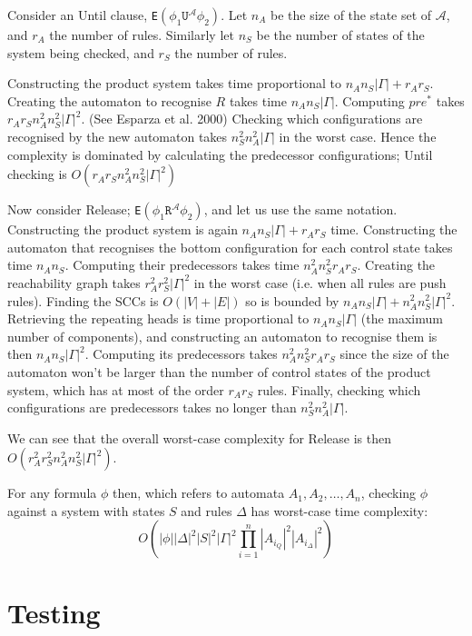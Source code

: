 \documentclass[11pt]{article}
\theoremstyle{definition}
\begin{document}
Consider an Until clause, \texttt{E}$(\phi_1\texttt{U}^{\mathcal{A}}\phi_2)$.
Let $n_A$ be the size of the state set of $\mathcal{A}$, and $r_A$ the number of rules.
Similarly let $n_S$ be the number of states of the system being checked, and
$r_S$ the number of rules.

Constructing the product system takes time proportional to $n_A n_S |\Gamma| + r_A r_S$.
Creating the automaton to recognise $R$ takes time $n_A n_S |\Gamma|$.
Computing $\textit{pre}^*$ takes $r_A r_S n_A^2 n_S^2 |\Gamma|^2$. (See Esparza et al. 2000\cite{EHRS00b})
Checking which configurations are recognised by the new automaton takes $n_S^2 n_A^2 |\Gamma|$ in the worst case.
Hence the complexity is dominated by calculating the predecessor configurations; Until checking is $O(r_A r_S n_A^2 n_S^2 |\Gamma|^2)$

Now consider Release; \texttt{E}$(\phi_1\texttt{R}^{\mathcal{A}}\phi_2)$, and
let us use the same notation.
Constructing the product system is again $n_A n_S |\Gamma| + r_A r_S$ time.
Constructing the automaton that recognises the bottom configuration for each
control state takes time $n_A n_S$. Computing their predecessors takes time
$n_A^2 n_S^2 r_A r_S$. Creating the reachability graph takes $r_A^2 r_S^2 |\Gamma|^2$ in
the worst case (i.e. when all rules are push rules). Finding the SCCs is $O(|V|
+ |E|)$ so is bounded by $n_A n_S |\Gamma| + n_A^2 n_S^2 |\Gamma|^2 $.
Retrieving the repeating heads
is time proportional to $n_A n_S |\Gamma|$ (the maximum number of components),
and constructing an automaton to recognise them is then $n_A n_S |\Gamma|^2 $.
Computing its predecessors takes $n_A^2 n_S^2 r_A r_S$ since the size of the
automaton won't be larger than the number of control states of the product
system, which has at most of the order $r_A r_S$ rules.
Finally, checking which configurations are predecessors takes no longer than
$n_S^2 n_A^2 |\Gamma|$.

We can see that the overall worst-case complexity for Release is then $O(r_A^2
r_S^2 n_A^2 n_S^2 |\Gamma|^2)$. 

For any formula $\phi$ then, which refers to automata $A_1, A_2, \dots, A_n$, checking $\phi$ against a system with states $S$ and rules $\Delta$ has worst-case time complexity:
\[O(
|\phi||\Delta|^2  |S|^2 |\Gamma|^2\prod_{i=1}^{n} |A_{i_Q}|^2 |A_{i_\Delta}|^2
) \]


\section{Testing}
\end{document}
